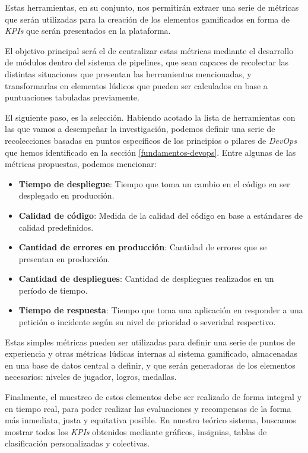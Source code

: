 \documentclass[journal]{IEEEtran}
\begin{document}
Estas herramientas, en su conjunto, nos permitirán extraer una serie de métricas que serán utilizadas para la creación de los elementos gamificados en forma de \textit{KPIs} que serán presentados en la plataforma.

El objetivo principal será el de centralizar estas métricas mediante el desarrollo de módulos dentro del sistema de pipelines, que sean capaces de recolectar las distintas situaciones que presentan las herramientas mencionadas, y transformarlas en elementos lúdicos que pueden ser calculados en base a puntuaciones tabuladas previamente.

El siguiente paso, es la selección. Habiendo acotado la lista de herramientas con las que vamos a desempeñar la investigación, podemos definir una serie de recolecciones basadas en puntos específicos de los principios o pilares de \textit{DevOps} que hemos identificado en la sección \ref{fundamentos-devops}. Entre algunas de las métricas propuestas, podemos mencionar:
\begin{itemize}
    \item \textbf{Tiempo de despliegue}: Tiempo que toma un cambio en el código en ser desplegado en producción.
    \item \textbf{Calidad de código}: Medida de la calidad del código en base a estándares de calidad predefinidos.
    \item \textbf{Cantidad de errores en producción}: Cantidad de errores que se presentan en producción.
    \item \textbf{Cantidad de despliegues}: Cantidad de despliegues realizados en un período de tiempo.
    \item \textbf{Tiempo de respuesta}: Tiempo que toma una aplicación en responder a una petición o incidente según su nivel de prioridad o severidad respectivo.
\end{itemize}

Estas simples métricas pueden ser utilizadas para definir una serie de puntos de experiencia y otras métricas lúdicas internas al sistema gamificado, almacenadas en una base de datos central a definir, y que serán generadoras de los elementos necesarios: niveles de jugador, logros, medallas.

Finalmente, el muestreo de estos elementos debe ser realizado de forma integral y en tiempo real, para poder realizar las evaluaciones y recompensas de la forma más inmediata, justa y equitativa posible. En nuestro teórico sistema, buscamos mostrar todos los \textit{KPIs} obtenidos mediante gráficos, insignias, tablas de clasificación personalizadas y colectivas.
\end{document}
